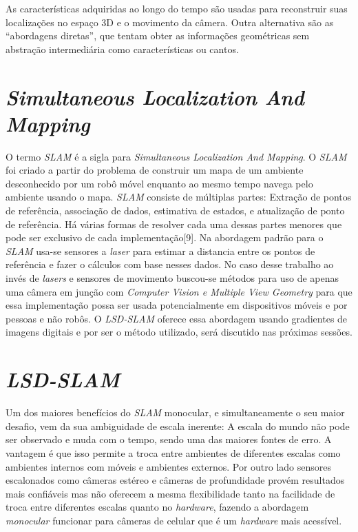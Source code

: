 As características adquiridas ao longo do tempo são usadas para reconstruir suas localizações no espaço 3D e o movimento da câmera. Outra alternativa são as “abordagens diretas”, que tentam obter as informações geométricas sem abstração intermediária como características ou cantos.


\section{\textit{Simultaneous Localization And Mapping}}

O termo \textit{SLAM} é a sigla para \textit{Simultaneous Localization And Mapping}. O \textit{SLAM} foi criado a partir do problema de construir um mapa de um ambiente desconhecido por um robô móvel enquanto ao mesmo tempo navega pelo ambiente usando o mapa. \textit{SLAM} consiste de múltiplas partes: Extração de pontos de referência, associação de dados, estimativa de estados, e atualização de ponto de referência. Há várias formas de resolver cada uma dessas partes menores que pode ser exclusivo de cada implementação[9]. Na abordagem padrão para o \textit{SLAM} usa-se sensores a \textit{laser} para estimar a distancia entre os pontos de referência e fazer o cálculos com base nesses dados. No caso desse trabalho ao invés de \textit{lasers} e sensores de movimento buscou-se métodos para uso de apenas uma câmera em junção com \textit{Computer Vision e Multiple View Geometry} para que essa implementação possa ser usada potencialmente em dispositivos móveis e por pessoas e não robôs. O \textit{LSD-SLAM} oferece essa abordagem usando gradientes de imagens digitais e por ser o método utilizado, será discutido nas próximas sessões.

\section{\textit{LSD-SLAM}}

Um dos maiores benefícios do \textit{SLAM} monocular, e simultaneamente o seu maior desafio, vem da sua ambiguidade de escala inerente: A escala do mundo não pode ser observado e muda com o tempo, sendo uma das maiores fontes de erro. A vantagem é que isso permite a troca entre ambientes de diferentes escalas como ambientes internos com móveis e ambientes externos. Por outro lado sensores escalonados como câmeras estéreo e câmeras de profundidade provém resultados mais confiáveis mas não oferecem a mesma flexibilidade tanto na facilidade de troca entre diferentes escalas quanto no \textit{hardware}, fazendo a abordagem \textit{monocular} funcionar para câmeras de celular que é um \textit{hardware} mais acessível. 

